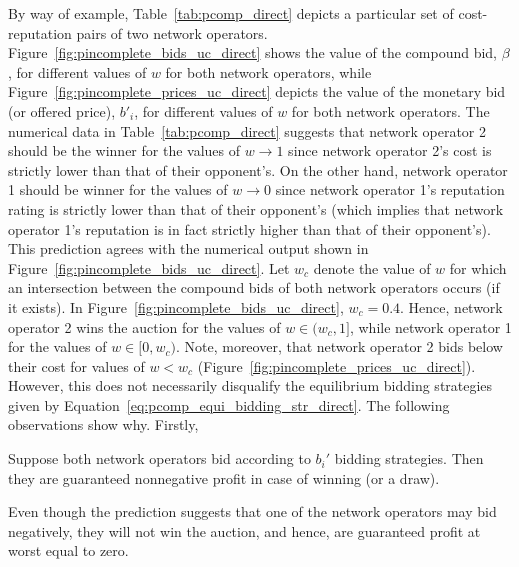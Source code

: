 By way of example, Table~\ref{tab:pcomp_direct} depicts a particular set of cost-reputation pairs of two network operators. Figure~\ref{fig:pincomplete_bids_uc_direct} shows the value of the compound bid, $\beta$, for different values of $w$ for both network operators, while Figure~\ref{fig:pincomplete_prices_uc_direct} depicts the value of the monetary bid (or offered price), $b'_i$, for different values of $w$ for both network operators. The numerical data in Table~\ref{tab:pcomp_direct} suggests that network operator 2 should be the winner for the values of $w\rightarrow 1$ since network operator 2's cost is strictly lower than that of their opponent's. On the other hand, network operator 1 should be winner for the values of $w\rightarrow 0$ since network operator 1's reputation rating is strictly lower than that of their opponent's (which implies that network operator 1's reputation is in fact strictly higher than that of their opponent's). This prediction agrees with the numerical output shown in Figure~\ref{fig:pincomplete_bids_uc_direct}. Let $w_c$ denote the value of $w$ for which an intersection between the compound bids of both network operators occurs (if it exists). In Figure~\ref{fig:pincomplete_bids_uc_direct}, $w_c=0.4$. Hence, network operator 2 wins the auction for the values of $w\in(w_c,1]$, while network operator 1 for the values of $w\in[0,w_c)$. Note, moreover, that network operator 2 bids below their cost for values of $w<w_c$ (Figure~\ref{fig:pincomplete_prices_uc_direct}). However, this does not necessarily disqualify the equilibrium bidding strategies given by Equation~\eqref{eq:pcomp_equi_bidding_str_direct}. The following observations show why. Firstly,
\begin{proposition}
\label{prop:pcomp_negative_bids_direct}
Suppose both network operators bid according to $b_i'$ bidding strategies. Then they are guaranteed nonnegative profit in case of winning (or a draw).
\end{proposition}
\noindent Even though the prediction suggests that one of the network operators may bid negatively, they will not win the auction, and hence, are guaranteed profit at worst equal to zero.

